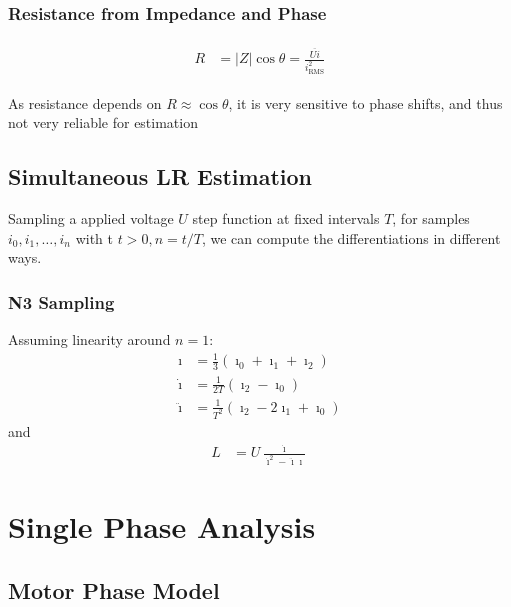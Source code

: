 \documentclass[12pt,a4paper,oneside,openany]{article}
\begin{document}
\subsubsection{Resistance from Impedance and Phase}

\begin{gather}
\begin{aligned}
R &= |Z| \cos \theta = \frac{\overline{U i}}{i_{\textrm{RMS}}^2}
\end{aligned}
\end{gather}

As resistance depends on $R \approx \cos \theta$, it is very sensitive to phase shifts, and thus not very reliable for estimation


\subsection{Simultaneous LR Estimation}

Sampling a  applied voltage $U$ step function at fixed intervals $T$, for samples $i_0, i_1, \ldots, i_n$ with t $t>0,n=t/T$, we can compute the differentiations in different ways.

\subsubsection{N3 Sampling}

Assuming linearity around $n=1$:
\begin{align}
{\imath} &= \frac{1}{3} (\imath_0 + \imath_1 + \imath_2) \\
\dot{\imath} &= \frac{1}{2T} (\imath_2 - \imath_0) \\
\ddot{\imath} &= \frac{1}{T^2} (\imath_2 - 2\imath_1 + \imath_0)
\end{align}
and
\begin{align}
L &= U \frac{\dot{\imath}}{\dot{\imath}^2 - \ddot{\imath} \imath}
\end{align}


\section{Single Phase Analysis}

\subsection{Motor Phase Model}
\end{document}
